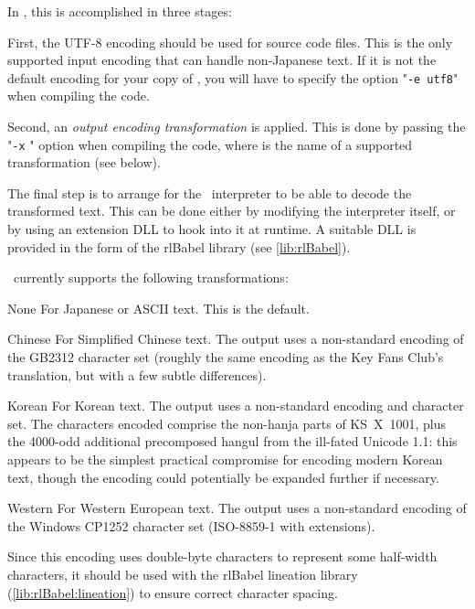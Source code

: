     In \package, this is accomplished in three stages:
    
    First, the UTF-8 encoding should be used for source code files.  This is the 
    only supported input encoding that can handle non-Japanese text.  If it is
    not the default encoding for your copy of \package, you will have to specify
    the option "\texttt{-e utf8}" when compiling the code.
    
    Second, an \emph{output encoding transformation} is applied.  This is done 
    by passing the "\texttt{-x} " option when compiling the code, 
    where  is the name of a supported transformation (see below).
    
    The final step is to arrange for the \reallive\ interpreter to be able to 
    decode the transformed text.  This can be done either by modifying the 
    interpreter itself, or by using an extension DLL to hook into it at 
    runtime.  A suitable DLL is provided in the form of the rlBabel library
    (see \ref{lib:rlBabel}).
    
    \package\ currently supports the following transformations:
    
    \begin{nicelist}
    \item[None]
      For Japanese or ASCII text. This is the default.
    \item[Chinese]
      For Simplified Chinese text. The output uses a non-standard encoding of 
      the GB2312 character set (roughly the same encoding as the Key Fans Club's 
       translation, but with a few subtle differences).
    \item[Korean]
      For Korean text. The output uses a non-standard encoding and character set.
      The characters encoded comprise the non-hanja parts of KS~X~1001, plus the
      4000-odd additional precomposed hangul from the ill-fated Unicode 1.1: this 
      appears to be the simplest practical compromise for encoding modern Korean
      text, though the encoding could potentially be expanded further if necessary.
    \item[Western]
      For Western European text. The output uses a non-standard encoding of
      the Windows CP1252 character set (ISO-8859-1 with extensions).
      
      Since this encoding uses double-byte characters to represent some 
      half-width characters, it should be used with the rlBabel lineation 
      library (\ref{lib:rlBabel:lineation}) to ensure correct character spacing.      
    \end{nicelist}

